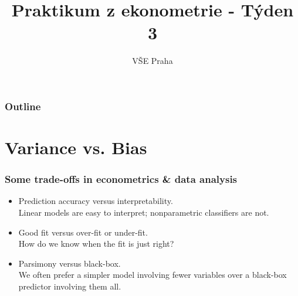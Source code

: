 \documentclass{beamer}
\title[Týden 3]{Praktikum z ekonometrie - Týden 3} %
\author{VŠE Praha} %
\institute[4EK417] %
{
\medskip
\textit{Tomáš Formánek} %
}
\date{} %
\begin{document}
\begin{frame}
\titlepage %
\end{frame}

\begin{frame}
\frametitle{Outline} %
\tableofcontents %
\end{frame}

\section{Variance vs. Bias} 




\begin{frame}
\frametitle{Some trade-offs in econometrics \& data analysis}

\begin{itemize}
  \item Prediction accuracy versus interpretability. 
  \\Linear models are easy to interpret; nonparametric classifiers are not.
  \vspace{0.2cm}
  \item Good fit versus over-fit or under-fit.
  \\ How do we know when the fit is just right?
  \vspace{0.2cm}
  \item Parsimony versus black-box.
  \\We often prefer a simpler model involving fewer variables over a black-box predictor involving them all.
\end{itemize}


\end{frame}


\end{document}
